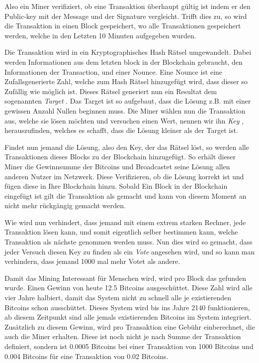 \noindent
Also ein Miner verifiziert, ob eine Transaktion überhaupt gültig ist indem er den Public-key mit der Message und der Signature vergleicht. Trifft dies zu, so wird die Transaktion in einen Block gespeichert,
wo alle Transaktionen gespeichert werden, welche in den Letzten 10 Minuten aufgegeben wurden.

\noindent
Die Transaktion wird in ein Kryptographisches Hash Rätsel umgewandelt. Dabei werden Informationen aus dem letzten block in der Blockchain gebraucht, den Informationen der Transaction, und einer Nounce.
Eine Nounce ist eine Zufallsgenerierte Zahl, welche zum Hash Rätsel hinzugefügt wird, dass dieser so Zufällig wie möglich ist. Dieses Rätsel generiert nun ein Resultat dem sogenannten \emph{\dq Target \dq}.
Das Target ist so aufgebaut, dass die Lösung z.B. mit einer gewissen Anzahl Nullen beginnen muss. Die Miner wählen nun die Transaktion aus, welche sie lösen möchten und versuchen einen Wert, nennen wir ihn
\emph{\dq Key \dq}, herauszufinden, welches es schafft, dass die Lösung kleiner als der Target ist.

\noindent
Findet nun jemand die Lösung, also den Key, der das Rätsel löst, so werden alle Transaktionen dieses Blocks zu der Blockchain hinzugefügt. So erhält dieser Miner die Gewinnsumme der Bitcoins und Broadcastet
seine Lösung allen anderen Nutzer im Netzwerk. Diese Verifizieren, ob die Lösung korrekt ist und fügen diese in Ihre Blockchain hinzu. Sobald Ein Block in der Blockchain eingefügt ist gilt die Transaktion
als gemacht und kann von diesem Moment an nicht mehr rückgängig gemacht werden.

\noindent
Wie wird nun verhindert, dass jemand mit einem extrem starken Rechner, jede Transaktion lösen kann, und somit eigentlich selber bestimmen kann, welche Transaktion als nächste genommen werden muss.
Nun dies wird so gemacht, dass jeder Versuch diesen Key zu finden als ein \emph{\dq Vote \dq} angesehen wird, und so kann man verhindern, dass jemand 1000 mal mehr Votet als andere.

\noindent
Damit das Mining Interessant für Menschen wird, wird pro Block das gefunden wurde. Einen Gewinn von heute 12.5 Bitcoins ausgeschüttet. Diese Zahl wird alle vier Jahre halbiert, damit das System nicht
zu schnell alle je existierenden Bitcoins schon ausschüttet. Dieses System wird bis ins Jahre 2140 funktionieren, ab diesem Zeitpunkt sind alle jemals existierenden Bitcoins im System integriert.
Zusätzlich zu diesem Gewinn, wird pro Transaktion eine Gebühr einberechnet, die auch die Miner erhalten. Diese ist noch nicht je nach Summe der Transaktion definiert, sondern ist 0.0005 Bitcoins bei
einer Transaktion von 1000 Bitcoins und 0.004 Bitcoins für eine Transaktion von 0.02 Bitcoins.


\newpage
